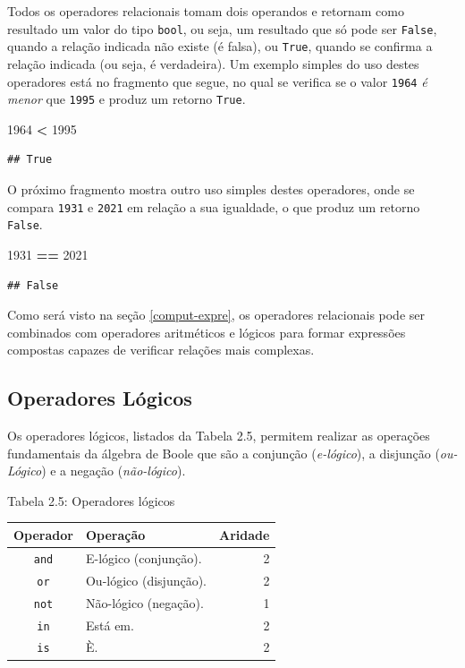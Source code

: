 \documentclass[
]{book}
\newenvironment{Shaded}{\begin{snugshade}}{\end{snugshade}}
\newcommand{\DecValTok}[1]{\textcolor[rgb]{0.00,0.00,0.81}{#1}}
\newcommand{\OperatorTok}[1]{\textcolor[rgb]{0.81,0.36,0.00}{\textbf{#1}}}
\begin{document}
Todos os operadores relacionais tomam dois operandos e retornam como resultado um valor do tipo \texttt{bool}, ou seja, um resultado que só pode ser \texttt{False}, quando a relação indicada não existe (é falsa), ou \texttt{True}, quando se confirma a relação indicada (ou seja, é verdadeira). Um exemplo simples do uso destes operadores está no fragmento que segue, no qual se verifica se o valor \texttt{1964} \emph{é menor} que \texttt{1995} e produz um retorno \texttt{True}.

\begin{Shaded}
\begin{Highlighting}[]
\DecValTok{1964} \OperatorTok{\textless{}} \DecValTok{1995}
\end{Highlighting}
\end{Shaded}

\begin{verbatim}
## True
\end{verbatim}

O próximo fragmento mostra outro uso simples destes operadores, onde se compara \texttt{1931} e \texttt{2021} em relação a sua igualdade, o que produz um retorno \texttt{False}.

\begin{Shaded}
\begin{Highlighting}[]
\DecValTok{1931} \OperatorTok{==} \DecValTok{2021}
\end{Highlighting}
\end{Shaded}

\begin{verbatim}
## False
\end{verbatim}

Como será visto na seção \ref{comput-expre}, os operadores relacionais pode ser combinados com operadores aritméticos e lógicos para formar expressões compostas capazes de verificar relações mais complexas.

\hypertarget{comput-opera-logic}{%
\subsection{Operadores Lógicos}\label{comput-opera-logic}}

Os operadores lógicos, listados da Tabela 2.5, permitem realizar as operações fundamentais da álgebra de Boole que são a conjunção (\emph{e-lógico}), a disjunção (\emph{ou-Lógico}) e a negação (\emph{não-lógico}).

Tabela 2.5: Operadores lógicos

\begin{longtable}[]{@{}clr@{}}
\toprule
Operador & Operação & Aridade \\
\midrule
\endhead
\texttt{and} & E-lógico (conjunção). & 2 \\
\texttt{or} & Ou-lógico (disjunção). & 2 \\
\texttt{not} & Não-lógico (negação). & 1 \\
\texttt{in} & Está em. & 2 \\
\texttt{is} & È. & 2 \\
\bottomrule
\end{longtable}
\end{document}
